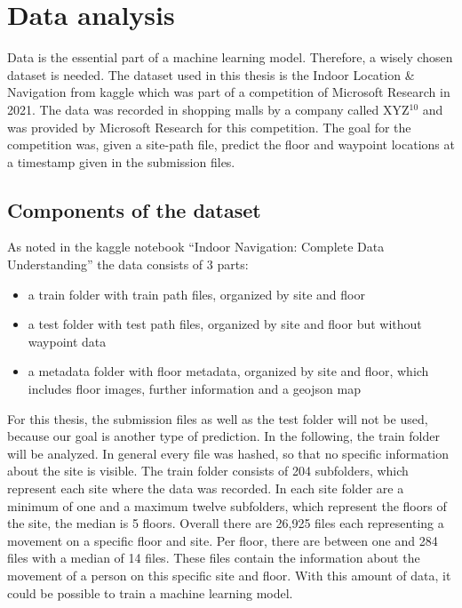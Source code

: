 \chapter{Data analysis}\label{sec:data-ana}

Data is the essential part of a machine learning model.
Therefore, a wisely chosen dataset is needed.
The dataset used in this thesis is the Indoor Location \& Navigation from kaggle\cite{kaggle} which was part of a competition of Microsoft Research in 2021\cite{IndoorLocationNavigation}.
The data was recorded in shopping malls by a company called XYZ\(^{10}\) and was provided by Microsoft Research for this competition.
The goal for the competition was, given a site-path file, predict the floor and waypoint locations at a timestamp given in the submission files.


\section{Components of the dataset}\label{sec:data}
As noted in the kaggle notebook ``Indoor Navigation: Complete Data Understanding''\cite{IndoorNavigationUnderstanding} the data consists of 3 parts:
% 
\begin{itemize}
    \item a train folder with train path files, organized by site and floor
    \item a test folder with test path files, organized by site and floor but without waypoint data
    \item a metadata folder with floor metadata, organized by site and floor, which includes floor images, further information and a geojson map
\end{itemize}

For this thesis, the submission files as well as the test folder will not be used, because our goal is another type of prediction.
In the following, the train folder will be analyzed.
In general every file was hashed, so that no specific information about the site is visible.
The train folder consists of 204 subfolders, which represent each site where the data was recorded.
In each site folder are a minimum of one and a maximum twelve subfolders, which represent the floors of the site, the median is 5 floors.
Overall there are 26,925 files each representing a movement on a specific floor and site.
Per floor, there are between one and 284 files with a median of 14 files.
These files contain the information about the movement of a person on this specific site and floor.
With this amount of data, it could be possible to train a machine learning model.


